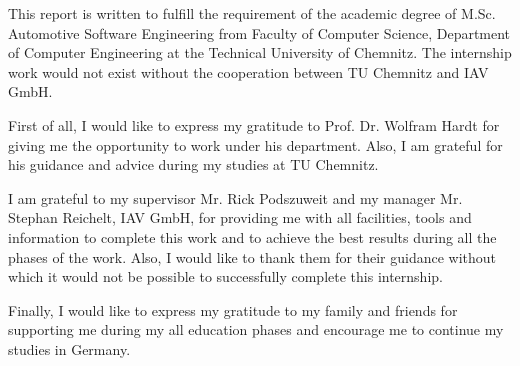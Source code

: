 \documentclass[a4paper, 12pt, oneside, BCOR1cm,toc=chapterentrywithdots]{scrbook}
\renewcommand*{\tableofcontents}{%
  	\begingroup
  	\tocsection
  	\tocfile{\contentsname}{toc}
  	\endgroup
}
\renewcommand*{\listoffigures}{%
  	\begingroup
  	\tocsection
  	\tocfile{\listfigurename}{lof}
  	\endgroup
}
\renewcommand{\listoftables}{
	\begingroup
	\tocsection
	\tocfile{\listtablename}{lot}
	\endgroup
}
\begin{document}

This report is written to fulfill the requirement of the academic degree of M.Sc. Automotive Software Engineering from Faculty of Computer Science, Department of Computer Engineering at the Technical University of Chemnitz. The internship work would not exist without the cooperation between TU Chemnitz and IAV GmbH.

First of all, I would like to express my gratitude to Prof. Dr. Wolfram Hardt for giving me the opportunity to work under his department. Also, I am grateful for his guidance and advice during my studies at TU Chemnitz.

I am grateful to my supervisor Mr. Rick Podszuweit and my manager Mr. Stephan Reichelt, IAV GmbH, for providing me with all facilities, tools and information to complete this work and to achieve the best results during all the phases of the work. Also, I would like to thank them for their guidance without which it would not be possible to successfully complete this internship.

Finally, I would like to express my gratitude to my family and friends for supporting me during my all education phases and encourage me to continue my studies in Germany. 


  



\tableofcontents
\listoffigures
\listoftables
\end{document}
